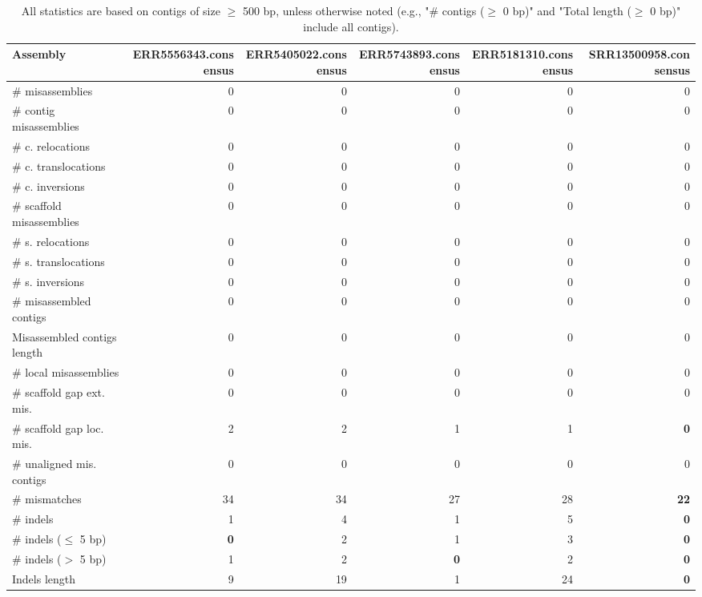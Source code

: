\documentclass[12pt,a4paper]{article}
\begin{document}
\begin{table}[ht]
\begin{center}
\caption{All statistics are based on contigs of size $\geq$ 500 bp, unless otherwise noted (e.g., "\# contigs ($\geq$ 0 bp)" and "Total length ($\geq$ 0 bp)" include all contigs).}
\begin{tabular}{|l*{5}{|r}|}
\hline
Assembly & ERR5556343.consensus & ERR5405022.consensus & ERR5743893.consensus & ERR5181310.consensus & SRR13500958.consensus \\ \hline
\# misassemblies & 0 & 0 & 0 & 0 & 0 \\ \hline
\hspace{2mm}\# contig misassemblies & 0 & 0 & 0 & 0 & 0 \\ \hline
\hspace{5mm}\# c. relocations & 0 & 0 & 0 & 0 & 0 \\ \hline
\hspace{5mm}\# c. translocations & 0 & 0 & 0 & 0 & 0 \\ \hline
\hspace{5mm}\# c. inversions & 0 & 0 & 0 & 0 & 0 \\ \hline
\hspace{2mm}\# scaffold misassemblies & 0 & 0 & 0 & 0 & 0 \\ \hline
\hspace{5mm}\# s. relocations & 0 & 0 & 0 & 0 & 0 \\ \hline
\hspace{5mm}\# s. translocations & 0 & 0 & 0 & 0 & 0 \\ \hline
\hspace{5mm}\# s. inversions & 0 & 0 & 0 & 0 & 0 \\ \hline
\# misassembled contigs & 0 & 0 & 0 & 0 & 0 \\ \hline
Misassembled contigs length & 0 & 0 & 0 & 0 & 0 \\ \hline
\# local misassemblies & 0 & 0 & 0 & 0 & 0 \\ \hline
\# scaffold gap ext. mis. & 0 & 0 & 0 & 0 & 0 \\ \hline
\# scaffold gap loc. mis. & 2 & 2 & 1 & 1 & {\bf 0} \\ \hline
\# unaligned mis. contigs & 0 & 0 & 0 & 0 & 0 \\ \hline
\# mismatches & 34 & 34 & 27 & 28 & {\bf 22} \\ \hline
\# indels & 1 & 4 & 1 & 5 & {\bf 0} \\ \hline
\hspace{5mm}\# indels ($\leq$ 5 bp) & {\bf 0} & 2 & 1 & 3 & {\bf 0} \\ \hline
\hspace{5mm}\# indels ($>$ 5 bp) & 1 & 2 & {\bf 0} & 2 & {\bf 0} \\ \hline
Indels length & 9 & 19 & 1 & 24 & {\bf 0} \\ \hline
\end{tabular}
\end{center}
\end{table}
\end{document}
